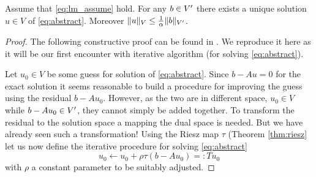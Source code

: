   \begin{theorem}\label{thm:lm} Assume that \eqref{eq:lm_assume} hold.
  For any $b\in V^{\prime}$ there exists a unique solution $u\in V$ of \eqref{eq:abstract}.
    Moreover $\lVert u\rVert_V\leq \tfrac{1}{\alpha}\lVert b\rVert_{V^{\prime}}$.
  \end{theorem}
  \begin{proof}
  The following constructive proof can be found in . We reproduce it here
  as it will be our first encounter with iterative algorithm (for solving \eqref{eq:abstract}).

  Let $u_0\in V$ be some guess for solution of \eqref{eq:abstract}. Since $b-Au=0$ for the
  exact solution it seems reasonable to build a procedure for improving the guess 
  using the residual $b-Au_0$. However, as the two are in different space, 
  $u_0\in V$ while $b-Au_0\in V^{\prime}$, they cannot simply be added together. To
  transform the residual to the solution space a mapping the dual space is needed. 
  But we have already seen such a transformation! Using the Riesz map $\tau$ (Theorem
  \ref{thm:riesz} let us now define the iterative procedure for solving
  \eqref{eq:abstract}
    \begin{equation}\label{eq:richardson}
      u_0 \leftarrow u_0 + \rho \tau (b-Au_0) =: T u_0
    \end{equation}
  with $\rho$ a constant parameter to be suitably adjusted.
  

\end{proof}
